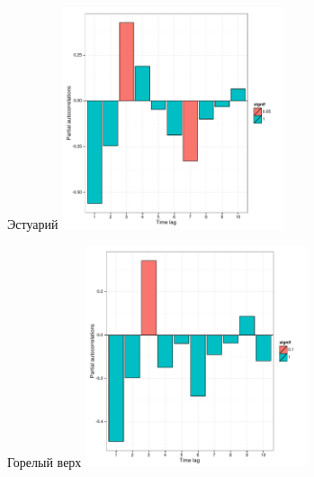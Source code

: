 \documentclass[12pt, a4paper]{disser}
\begin{document}
	\begin{figure}[ht]
	
	\begin{minipage}[b]{.46\linewidth}
	\begin{center}
	{\tiny Эстуарий}
		\includegraphics[width=65mm]{../White_Sea/oneyear_all_Kandalaksha_all/perm_PRCF_Estuary_N1y.pdf}

	\end{center}
	\end{minipage}
	\hfil %
	\begin{minipage}[b]{.46\linewidth}
	\begin{center}
	{\tiny Горелый верх}
		\includegraphics[width=65mm]{../White_Sea/oneyear_all_Kandalaksha_all/perm_PRCF_Goreliy_high_N1y.pdf}
	\end{center}
	\end{minipage}




\end{figure}
\end{document}
